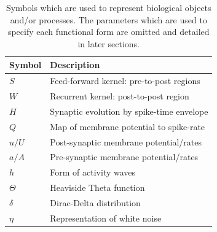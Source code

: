 \begin{table}
	\centering
	\begin{tabular}{| l || l |}
		\hline
		Symbol & Description \\
		\hline
		$S$ &Feed-forward kernel: pre-to-post regions \\
		$W$ &Recurrent kernel: post-to-post region \\
		$H$ &Synaptic evolution by spike-time envelope \\
		$Q$ &Map of membrane potential to spike-rate\\
		$u/U$ &Post-synaptic membrane potential/rates\\
		$a/A$ &Pre-synaptic membrane potential/rates\\
		$h$ &Form of activity waves\\
		$\Theta$ &Heaviside Theta function\\
		$\delta$ &Dirac-Delta distribution\\
		$\eta$ &Representation of white noise\\
		\hline
	\end{tabular}
	\caption{Symbols which are used to represent biological objects and/or processes. The parameters which are used to specify each functional form are omitted and detailed in later sections. \label{table:glossary}}
\end{table}

